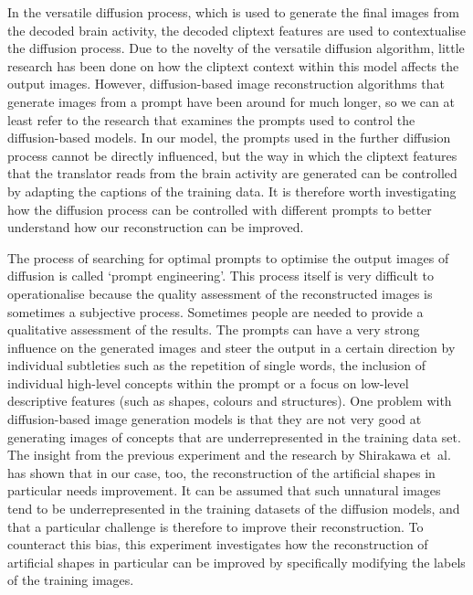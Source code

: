 In the versatile diffusion process, which is used to generate the final images from the decoded brain activity, the decoded cliptext features are used to contextualise the diffusion process\cite{ozcelikNaturalSceneReconstruction2023,xuVersatileDiffusionText2024}. Due to the novelty of the versatile diffusion algorithm, little research has been done on how the cliptext context within this model affects the output images. However, diffusion-based image reconstruction algorithms that generate images from a prompt have been around for much longer\cite{rombachHighResolutionImageSynthesis2022,sahariaPhotorealisticTexttoimageDiffusion2022}, so we can at least refer to the research that examines the prompts used to control the diffusion-based models. In our model, the prompts used in the further diffusion process cannot be directly influenced, but the way in which the cliptext features that the translator reads from the brain activity are generated can be controlled by adapting the captions of the training data. It is therefore worth investigating how the diffusion process can be controlled with different prompts to better understand how our reconstruction can be improved. 

The process of searching for optimal prompts to optimise the output images of diffusion is called `prompt engineering'\cite{witteveenInvestigatingPromptEngineering2022}. This process itself is very difficult to operationalise because the quality assessment of the reconstructed images is sometimes a subjective process. Sometimes people are needed to provide a qualitative assessment of the results\cite{pavlichenkoBestPromptsTexttoImage2023}. The prompts can have a very strong influence on the generated images and steer the output in a certain direction by individual subtleties such as the repetition of single words,  the inclusion of individual high-level concepts within the prompt or a focus on low-level descriptive features (such as shapes, colours and structures)\cite{witteveenInvestigatingPromptEngineering2022}. One problem with diffusion-based image generation models is that they are not very good at generating images of concepts that are underrepresented in the training data set\cite{samuelGeneratingImagesRare2024}. The insight from the previous experiment and the research by Shirakawa et\ al.\cite{shirakawaSpuriousReconstructionBrain2024} has shown that in our case, too, the reconstruction of the artificial shapes in particular needs improvement. It can be assumed that such unnatural images tend to be underrepresented in the training datasets of the diffusion models\cite{schuhmannLAION400MOpenDataset2021, schuhmannLAION5BOpenLargescale2022}, and that a particular challenge is therefore to improve their reconstruction. To counteract this bias, this experiment investigates how the reconstruction of artificial shapes in particular can be improved by specifically modifying the labels of the training images. 

